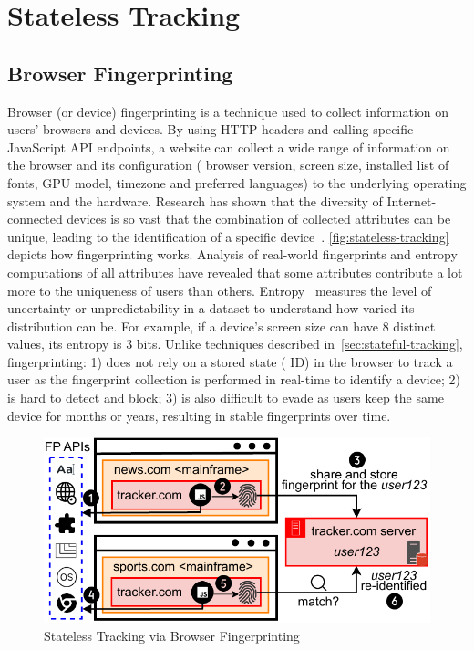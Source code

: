 \section{Stateless Tracking}
\label{sec:stateless-tracking}

\subsection{Browser Fingerprinting}
\label{sec:browser-fingerprinting}

Browser (or device) fingerprinting is a technique used to collect information on users’ browsers and devices. 
%
By using HTTP headers and calling specific JavaScript API endpoints, a website can collect a wide range of information on the browser and its configuration (\eg{} browser version, screen size, installed list of fonts, GPU model, timezone and preferred languages) to the underlying operating system and the hardware. 
%
Research has shown that the diversity of Internet-connected devices is so vast that the combination of collected attributes can be unique, leading to the identification of a specific device~\cite{eckersleyHowUniqueYour2010, laperdrixBeautyBeastDiverting2016,gomez-boixHidingCrowdAnalysis2018}. 
%
\autoref{fig:stateless-tracking} depicts how fingerprinting works.
%
Analysis of real-world fingerprints and entropy computations of all attributes have revealed that some attributes contribute a lot more to the uniqueness of users than others. 
%
Entropy~\cite{bacis2024assessing} measures the level of uncertainty or unpredictability in a dataset to understand how varied its distribution can be. 
%
For example, if a device's screen size can have 8 distinct values, its entropy is 3 bits.
%
Unlike techniques described in~\autoref{sec:stateful-tracking}, fingerprinting: 
%
1) does not rely on a stored state (\ie{} ID) in the browser to track a user as the fingerprint collection is performed in real-time to identify a device; 
%
2) is hard to detect and block; 
%
3) is also difficult to evade as users keep the same device for months or years, resulting in stable fingerprints over time.

\begin{figure}[htbp]
    \vspace{-2mm}
    \centering
    \includegraphics[width=0.8\linewidth]{figures/tracking-mechanisms-fingerprinting.pdf}
    \caption{Stateless Tracking via Browser Fingerprinting}
    \label{fig:stateless-tracking}
    \vspace{-2mm}
\end{figure}

